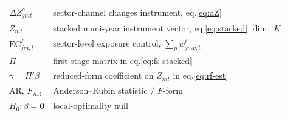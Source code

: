 \documentclass{article}
\newcommand{\EC}{\mathrm{EC}}
\newcommand{\bzero}{\mathbf{0}}
\theoremstyle{plain}
\theoremstyle{definition}
\theoremstyle{remark}
\begin{document}
\begin{center}
\begin{tabular}{ll}
$\Delta Z^{c}_{jmt}$ & sector-channel changes instrument, eq.\eqref{eq:dZ} \\
$Z_{mt}$ & stacked muni-year instrument vector, eq.\eqref{eq:stacked}, dim.\ $K$ \\
$\EC^{\ell}_{jm,t}$ & sector-level exposure control, $\sum_p w^{\ell}_{jmp,t}$ \\
$\Pi$ & first-stage matrix in eq.\eqref{eq:fs-stacked} \\
$\gamma=\Pi'\beta$ & reduced-form coefficient on $Z_{mt}$ in eq.\eqref{eq:rf-est} \\
$\mathrm{AR},\,F_{\mathrm{AR}}$ & Anderson--Rubin statistic / $F$-form \\
$H_0:\beta=\bzero$ & local-optimality null \\
\bottomrule
\end{tabular}
\end{center}
\end{document}
